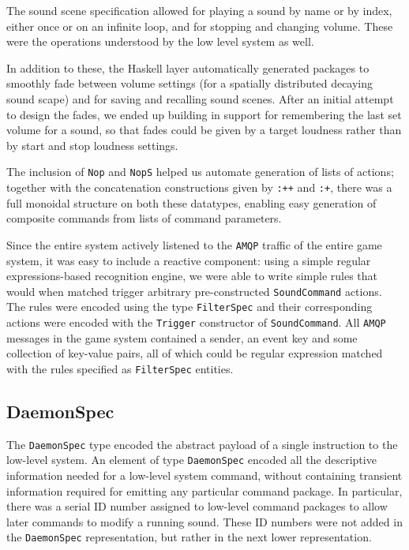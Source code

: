 The sound scene specification allowed for playing a sound
by name or by index, either once or on an infinite loop, and for
stopping and changing volume. These were the operations understood by
the low level system as well.

In addition to these, the Haskell layer automatically generated
packages to smoothly fade between volume settings (for a spatially
distributed decaying sound scape) and for saving and recalling sound
scenes. After an initial attempt to design the fades, we ended up building
in support for remembering the last set volume for a sound, so that
fades could be given by a target loudness rather than by start and stop
loudness settings.

The inclusion of \texttt{Nop} and \texttt{NopS} helped us automate
generation of lists of actions; together with the concatenation
constructions given by \texttt{:++} and \texttt{:+}, there was a full
monoidal structure on both these datatypes, enabling easy generation
of composite commands from lists of command parameters. 

Since the entire system actively listened to the \texttt{AMQP} traffic of the
entire game system, it was easy to include a reactive component: using
a simple regular expressions-based recognition engine, we were able
to write simple rules that would when matched trigger arbitrary
pre-constructed \texttt{SoundCommand} actions. The rules were encoded
using the type \texttt{FilterSpec} and their corresponding actions were
encoded with the \texttt{Trigger} constructor of
\texttt{SoundCommand}. All \texttt{AMQP} messages in the game system contained a
sender, an event key and some collection of key-value pairs, all of
which could be regular expression matched with the rules specified as
\texttt{FilterSpec} entities.

\subsection{DaemonSpec}
\label{sec:daemonspec}

The \texttt{DaemonSpec} type encoded the abstract payload of a single
instruction to the low-level system. An element of type
\texttt{DaemonSpec} encoded all the descriptive information needed for
a low-level system command, without containing transient information
required for emitting any particular command package. In particular,
there was a serial ID number assigned to low-level command packages to
allow later commands to modify a running sound. These ID numbers were
not added in the \texttt{DaemonSpec} representation, but rather in the
next lower representation.

